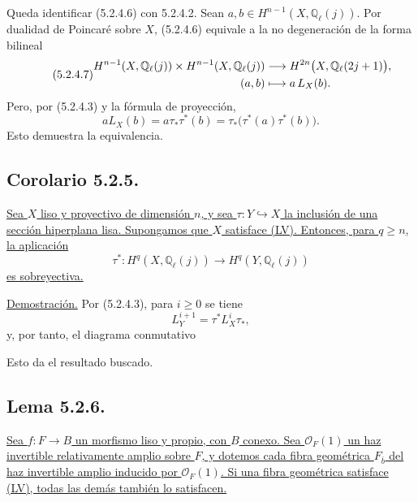 Queda identificar (5.2.4.6) con 5.2.4.2. Sean
$a,b\in H^{n-1}(X,\mathbb Q_\ell(j))$. Por dualidad de Poincaré sobre
$X$, (5.2.4.6) equivale a la no degeneración de la forma bilineal
\begin{equation}\tag{5.2.4.7}
\begin{aligned}
H^{n-1}(X,\mathbb Q_\ell(j))\times
H^{n-1}(X,\mathbb Q_\ell(j))
&\longrightarrow H^{2n}\bigl(X,\mathbb Q_\ell(
  \sisi{2j+2}{2j+1})\bigr),\\
(a,b)&\longmapsto a\,L_X(b).
\end{aligned}
\end{equation}
Pero, por (5.2.4.3) y la fórmula de proyección,
\[
aL_X(b)=a\tau_*\tau^*(b)
=\tau_*\bigl(\tau^*(a)\tau^*(b)\bigr).
\]
Esto demuestra la equivalencia.

\pageoriginale

\subsection*{Corolario 5.2.5.}
\underline{Sea $X$ liso y proyectivo de dimensión $n$, y sea
$\tau:Y\hookrightarrow X$ la inclusión de una sección hiperplana lisa.
Supongamos que $X$ satisface (LV). Entonces, para $q\geq n$, la
aplicación}
\[
\tau^*:H^q(X,\mathbb Q_\ell(j))
\longrightarrow H^q(Y,\mathbb Q_\ell(j))
\]
\underline{es sobreyectiva.}

\noindent\underline{Demostración.}
Por (5.2.4.3), para $i\geq0$ se tiene
\[
L_Y^{i+1}=\tau^*L_X^i\tau_*,
\]
y, por tanto, el diagrama conmutativo
\begin{center}
\end{center}
Esto da el resultado buscado.

\pageoriginale

\subsection*{Lema 5.2.6.}
\underline{Sea $f:F\to B$ un morfismo liso y propio, con $B$ conexo.
Sea $\mathcal O_F(1)$ un haz invertible relativamente amplio sobre
$F$, y dotemos cada fibra geométrica $F_{\bar b}$ del haz invertible
amplio inducido por $\mathcal O_F(1)$. Si una fibra geométrica
satisface (LV), todas las demás también lo satisfacen.}

